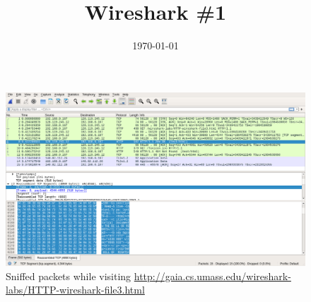 \documentclass{homework}
\title{Wireshark \#1}
\date{\today}
\begin{document}
\maketitle

\begin{figure}[H]
  \centering
  \hspace*{-0.2\textwidth}\includegraphics[width=1.4\textwidth]{file3-image}
  \caption{Sniffed packets while visiting \url{http://gaia.cs.umass.edu/wireshark-labs/HTTP-wireshark-file3.html}}
\end{figure}
\vspace*{2em}
\end{document}
